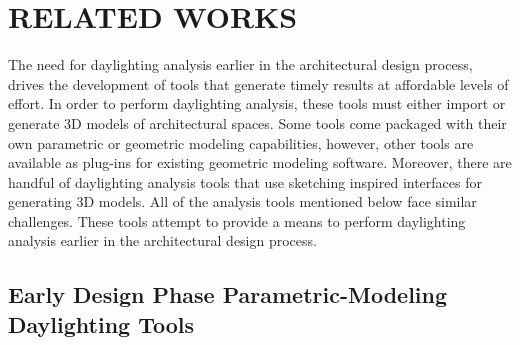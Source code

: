 \chapter{RELATED WORKS} \label{sec:introduction}
The need for daylighting analysis earlier in the architectural design process, drives the development of tools that generate timely results at affordable levels of effort.
In order to perform daylighting analysis, these tools must either import or generate 3D models of architectural spaces.
Some tools come packaged with their own parametric or geometric modeling capabilities, however, other tools are available as plug-ins for existing geometric modeling software.
Moreover, there are handful of daylighting analysis tools that use sketching inspired interfaces for generating 3D models.
All of the analysis tools mentioned below face similar challenges.
These tools attempt to provide a means to perform daylighting analysis earlier in the architectural design process.


\section{Early Design Phase Parametric-Modeling Daylighting Tools}
	




